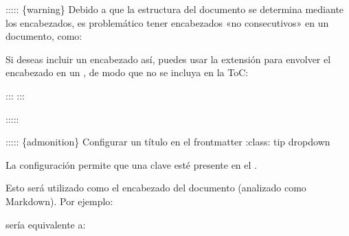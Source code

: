 \documentclass[a4paper,10pt,spanish]{sphinxmanual}
\begin{document}
\sphinxAtStartPar
::::: \{warning\}
Debido a que la estructura del documento se determina mediante los encabezados, es problemático tener encabezados «no consecutivos» en un documento, como:

\begin{sphinxVerbatim}[commandchars=\\\{\}]
\end{sphinxVerbatim}

\sphinxAtStartPar
Si deseas incluir un encabezado así, puedes usar la extensión {\hyperref[\detokenize{configuracion_inicial/013.guia_de_myst_parser:syntax/attributes/block}]{}} para envolver el encabezado en un , de modo que no se incluya en la ToC:

\begin{sphinxVerbatim}[commandchars=\\\{\}]
:::
:::
\end{sphinxVerbatim}

\sphinxAtStartPar
:::::

\sphinxAtStartPar
::::: \{admonition\} Configurar un título en el front\sphinxhyphen{}matter
:class: tip dropdown

\sphinxAtStartPar
{}

\sphinxAtStartPar
La configuración  permite que una clave  esté presente en el {\hyperref[\detokenize{configuracion_inicial/013.guia_de_myst_parser:syntax/frontmatter}]{}}.

\sphinxAtStartPar
Esto será utilizado como el encabezado del documento (analizado como Markdown). Por ejemplo:

\begin{sphinxVerbatim}[commandchars=\\\{\}]
\PYGZhy{}\PYGZhy{}\PYGZhy{}
\end{sphinxVerbatim}

\sphinxAtStartPar
sería equivalente a:

\begin{sphinxVerbatim}[commandchars=\\\{\}]
\end{sphinxVerbatim}
\end{document}
